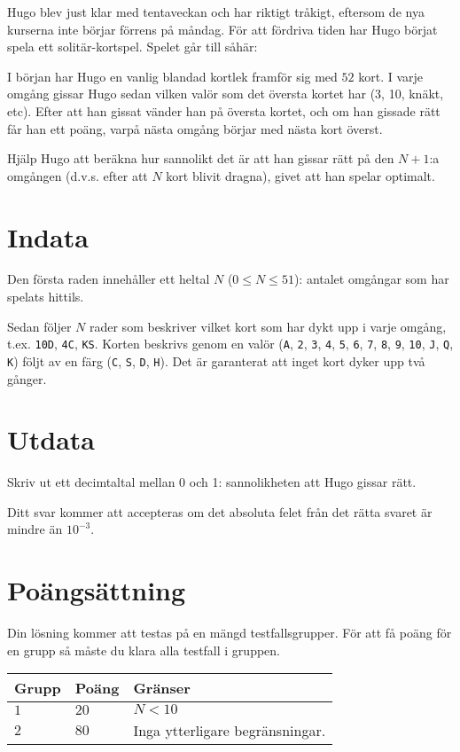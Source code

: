 Hugo blev just klar med tentaveckan och har riktigt tråkigt, eftersom de nya kurserna inte börjar förrens på måndag.
För att fördriva tiden har Hugo börjat spela ett solitär-kortspel. Spelet går till såhär:

I början har Hugo en vanlig blandad kortlek framför sig med $52$ kort. I varje omgång gissar Hugo sedan vilken valör som det översta kortet har (3, 10, knäkt, etc).
Efter att han gissat vänder han på översta kortet, och om han gissade rätt får han ett poäng, varpå nästa omgång börjar med nästa kort överst.

Hjälp Hugo att beräkna hur sannolikt det är att han gissar rätt på den $N+1$:a omgången (d.v.s. efter att $N$ kort blivit dragna),
givet att han spelar optimalt.

\section*{Indata}
Den första raden innehåller ett heltal $N$ ($0 \le N \le 51$): antalet omgångar som har spelats hittils.

Sedan följer $N$ rader som beskriver vilket kort som har dykt upp i varje omgång, t.ex. \texttt{10D}, \texttt{4C}, \texttt{KS}.
Korten beskrivs genom en valör (\texttt{A}, \texttt{2}, \texttt{3}, \texttt{4}, \texttt{5}, \texttt{6}, \texttt{7}, \texttt{8},
\texttt{9}, \texttt{10}, \texttt{J}, \texttt{Q}, \texttt{K}) följt av en färg (\texttt{C}, \texttt{S}, \texttt{D}, \texttt{H}).
Det är garanterat att inget kort dyker upp två gånger.

\section*{Utdata}
Skriv ut ett decimtaltal mellan 0 och 1: sannolikheten att Hugo gissar rätt.

Ditt svar kommer att accepteras om det absoluta felet från det rätta svaret är mindre än $10^{-3}$.

\section*{Poängsättning}
Din lösning kommer att testas på en mängd testfallsgrupper.
För att få poäng för en grupp så måste du klara alla testfall i gruppen.

\noindent
\begin{tabular}{| l | l | p{12cm} |}
  \hline
  \textbf{Grupp} & \textbf{Poäng} & \textbf{Gränser} \\ \hline
  $1$    & $20$       & $N < 10$ \\ \hline
  $2$    & $80$       & Inga ytterligare begränsningar. \\ \hline
\end{tabular}
